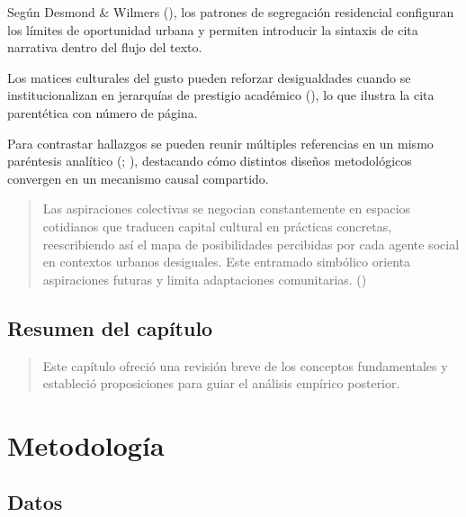 \documentclass[
  a4paper,
  oneside]{scrbook}
\begin{document}
Según Desmond \& Wilmers (), los
patrones de segregación residencial configuran los límites de
oportunidad urbana y permiten introducir la sintaxis de cita narrativa
dentro del flujo del texto.

Los matices culturales del gusto pueden reforzar desigualdades cuando se
institucionalizan en jerarquías de prestigio académico
(), lo que ilustra la
cita parentética con número de página.

Para contrastar hallazgos se pueden reunir múltiples referencias en un
mismo paréntesis analítico (; ), destacando
cómo distintos diseños metodológicos convergen en un mecanismo causal
compartido.

\begin{quote}
Las aspiraciones colectivas se negocian constantemente en espacios
cotidianos que traducen capital cultural en prácticas concretas,
reescribiendo así el mapa de posibilidades percibidas por cada agente
social en contextos urbanos desiguales. Este entramado simbólico orienta
aspiraciones futuras y limita adaptaciones comunitarias.
()
\end{quote}

\section{Resumen del capítulo}\label{resumen-del-capuxedtulo}

\begin{quote}
Este capítulo ofreció una revisión breve de los conceptos fundamentales
y estableció proposiciones para guiar el análisis empírico posterior.
\end{quote}


\chapter{Metodología}\label{metodologuxeda}

\section{Datos}\label{datos}
\end{document}
